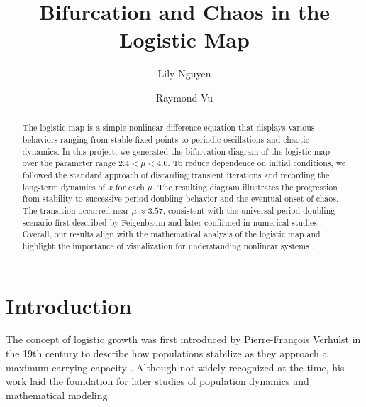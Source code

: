 \documentclass[linenumbers, RNAAS, trackchanges]{aastex631}
\begin{document}
\title{Bifurcation and Chaos in the Logistic Map}
\author{Lily Nguyen}

\author{Raymond Vu}


\begin{abstract}
\noindent The logistic map is a simple nonlinear difference equation that displays
various behaviors ranging from stable fixed points to periodic oscillations
and chaotic dynamics. In this project, we generated the bifurcation
diagram of the logistic map over the parameter range $2.4< \mu < 4.0$. To reduce
dependence on initial conditions, we followed the standard approach of discarding 
transient iterations and recording the long-term dynamics of $x$
for each $\mu$. The resulting diagram illustrates the progression from
stability to successive period-doubling behavior and the eventual onset of
chaos. The transition occurred near $\mu\approx3.57$, consistent
with the universal period-doubling scenario first described by Feigenbaum \cite{feig}
and later confirmed in numerical studies \cite{chen}. Overall, 
our results align with the mathematical analysis of the logistic map 
\cite{bubolo} and highlight the importance of visualization for understanding
nonlinear systems \cite{boeing}.

\end{abstract}



\section{Introduction} \label{sec:intro}

The concept of logistic growth was first introduced by Pierre-François
Verhulst in the 19th century to describe how populations stabilize as they 
approach a maximum carrying capacity \cite{sch}. Although not widely
recognized at the time, his work laid the foundation for later studies of
population dynamics and mathematical modeling.
\end{document}
